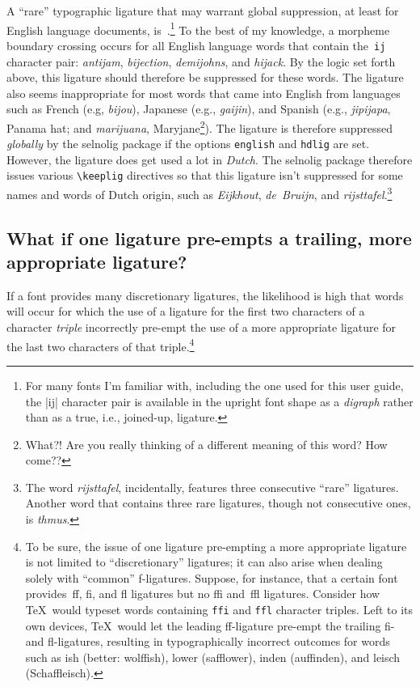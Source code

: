 \documentclass[11pt]{article}
\newcommand{\pkg}[1]{\textsf{#1}}
\newcommand{\opt}[1]{\texttt{#1}}
\newcommand{\cmmd}[1]{\texttt{\textbackslash #1}}
\begin{document}
A \enquote{rare} typographic ligature that may warrant global suppression, at least for English language documents, is~.\footnote{For many fonts I'm familiar with, including the one used for this user guide, the |ij| character pair is available in the upright font shape as a \emph{digraph} rather than as a true, i.e., joined-up, ligature.} To the best of my knowledge, a morpheme boundary crossing occurs for all English language words that contain the~\opt{ij} character pair: \emph{antijam}, \emph{bijection}, \emph{demijohns}, and \emph{hijack}. By the logic set forth above, this ligature should therefore be suppressed for these words. The  ligature also seems inappropriate for most words that came into English from languages such as French (e.g, \emph{bijou}), Japanese (e.g., \emph{gaijin}), and Spanish (e.g., \emph{jipijapa}, Panama hat; and \emph{marijuana},  Maryjane\footnote{What?! Are you really thinking of a different meaning of this word? How come??}). The  ligature is therefore suppressed \emph{globally} by the \pkg{selnolig} package if the options \opt{english} and \opt{hdlig} are set.
However, the \emph{} ligature does get used a lot in \emph{Dutch}. The \pkg{selnolig} package therefore issues various \cmmd{keeplig} directives so that this ligature isn't suppressed for some names and words of Dutch origin, such as \emph{Eijkhout}, \emph{de~Bruijn}, and \emph{rijsttafel}.\footnote{The word \emph{rijsttafel}, incidentally, features three consecutive \enquote{rare} ligatures. Another word that contains three rare ligatures, though not consecutive ones, is \emph{thmus}. }



\subsection{What if one ligature pre-empts a trailing, more appropriate ligature?} \label{sec:preempt}

If a font provides many discretionary ligatures, the likelihood is high that words will occur for which the use of a ligature for the first two characters of a character \emph{triple} incorrectly pre-empt the use of a more appropriate ligature for the last two characters of that triple.\footnote{To be sure, the issue of one ligature pre-empting a more appropriate ligature is not limited to \enquote{discretionary} ligatures; it can also arise when dealing solely with \enquote{common} f-ligatures. Suppose, for instance, that a certain font provides~ff, fi, and fl ligatures but no ffi and~ffl ligatures. Consider how \TeX\ would typeset words containing \opt{ffi} and \opt{ffl} character triples. Left to its own devices, \TeX\ would let the leading ff-ligature pre-empt the trailing fi- and fl-ligatures, resulting in typographically incorrect outcomes for words such as ish (better: wolffish), lower (safflower), inden (auffinden), and leisch (Schaffleisch).}
\end{document}
